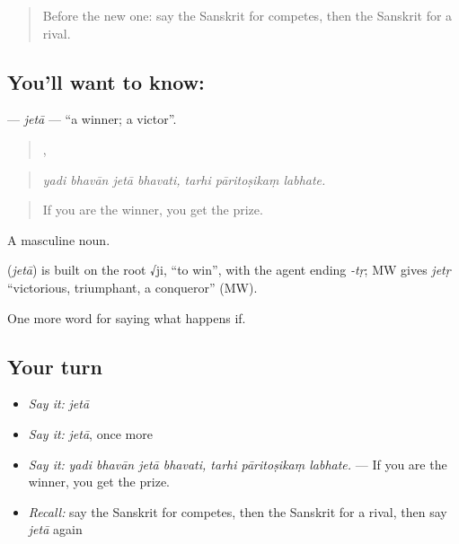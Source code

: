 \label{lesson:SA-C385-jeta}



\begin{quote}
Before the new one: say the Sanskrit for competes, then the Sanskrit for a rival.
\end{quote}

\subsection*{You'll want to know: }
\textbf{} — \emph{jetā} — \textquotedblleft{}a winner; a victor\textquotedblright{}.

\begin{quote}
   ,   
\end{quote}

\begin{quote}
\emph{yadi bhavān jetā bhavati, tarhi pāritoṣikaṃ labhate.}
\end{quote}

\begin{quote}
If you are the winner, you get the prize.
\end{quote}

A masculine noun.

\begin{cousinweb}
\textbf{} (\emph{jetā}) is built on the root √ji, \textquotedblleft{}to win\textquotedblright{}, with the agent ending \emph{-tṛ}; MW gives \emph{jetṛ} \textquotedblleft{}victorious, triumphant, a conqueror\textquotedblright{} (MW).
\end{cousinweb}

\begin{grammarlens}[title={What you've built}]
One more word for saying what happens if.
\end{grammarlens}

\subsection*{Your turn}
\begin{itemize}
\raggedright
  \item \emph{Say it:} \emph{jetā}
  \item \emph{Say it:} \emph{jetā}, once more
  \item \emph{Say it:} \emph{yadi bhavān jetā bhavati, tarhi pāritoṣikaṃ labhate.} — If you are the winner, you get the prize.
  \item \emph{Recall:} say the Sanskrit for competes, then the Sanskrit for a rival, then say \emph{jetā} again
\end{itemize}

